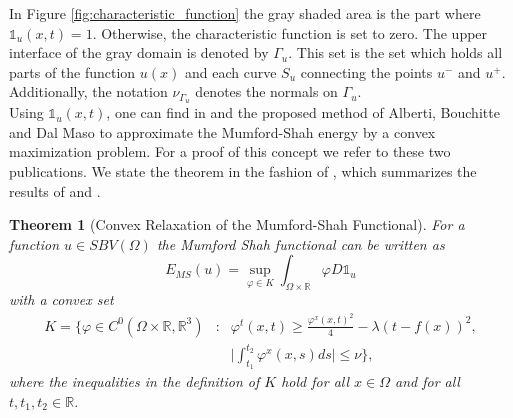 \documentclass[abstracton]{scrreprt}
\newtheorem{theorem}{Theorem}[chapter]
\begin{document}
        In Figure \ref{fig:characteristic_function} the gray shaded area is the part where $\mathds{1}_{u}(x, t) = 1$. Otherwise, the characteristic function is set to zero. The upper interface of the gray domain is denoted by $\Gamma_{u}$. This set is the set which holds all parts of the function $u(x)$ and each curve $S_{u}$ connecting the points $u^{-}$ and $u^{+}$. Additionally, the notation $\nu_{\Gamma_{u}}$ denotes the normals on $\Gamma_{u}$.\\

        Using $\mathds{1}_{u}(x, t)$, one can find in \cite{Alberti-et-al-lnss} and \cite{Alberti-et-al-cvpde} the proposed method of Alberti, Bouchitte and Dal Maso to approximate the Mumford-Shah energy by a convex maximization problem. For a proof of this concept we refer to these two publications. We state the theorem in the fashion of \cite{Pock-et-al-iccv09}, which summarizes the results of \cite{Alberti-et-al-lnss} and \cite{Alberti-et-al-cvpde}.
        \begin{theorem}[Convex Relaxation of the Mumford-Shah Functional]
        \label{convex_relaxation_of_the_mumford_shah_functional}
            For a function $u \in SBV(\Omega)$ the Mumford Shah functional can be written as
                \begin{equation}
                    E_{MS}(u) = \sup_{\varphi \in K} \int_{\Omega \times \mathbb{R}} \varphi D\mathds{1}_{u}
                    \label{eq:convex_relaxed_ms}
                \end{equation}
            with a convex set
                \begin{eqnarray}
                    K = \bigg\{ \varphi \in C^{0}(\Omega \times \mathbb{R}, \mathbb{R}^{3}) &:& \varphi^{t}(x, t) \ge \frac{\varphi^{x}(x,t)^{2}}{4} - \lambda(t - f(x))^{2}, \\
                    &&\bigg| \int^{t_{2}}_{t_{1}} \varphi^{x}(x,s)ds \bigg| \le \nu \bigg\}, \label{eq:set_k_continuous}
                \end{eqnarray}
            where the inequalities in the definition of $K$ hold for all $x \in \Omega$ and for all $t, t_{1}, t_{2} \in \mathbb{R}$.
        \end{theorem}
\end{document}
